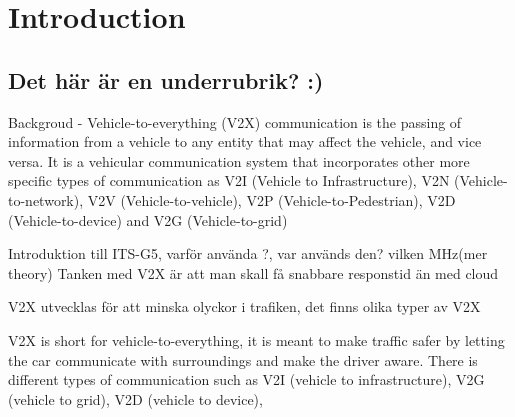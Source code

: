 \section{Introduction}
\subsection{Det här är en underrubrik? :)}
Backgroud - Vehicle-to-everything (V2X) communication is the passing of information from
a vehicle to any entity that may affect the vehicle, and vice versa. It is a vehicular
communication system that incorporates other more specific types of communication as 
V2I (Vehicle to Infrastructure), V2N (Vehicle-to-network), V2V (Vehicle-to-vehicle), V2P (Vehicle-to-Pedestrian), V2D (Vehicle-to-device) and V2G (Vehicle-to-grid) 

Introduktion till ITS-G5, varför använda ?, var används den? vilken MHz(mer theory)
Tanken med V2X är att man skall få snabbare responstid än med cloud 

V2X utvecklas för att minska olyckor i trafiken, det finns olika typer av V2X



V2X is short for vehicle-to-everything, it is meant to make traffic safer by letting the car communicate with surroundings and make the driver aware. There is different types of communication such as V2I (vehicle to infrastructure), V2G (vehicle to grid), V2D (vehicle to device), 